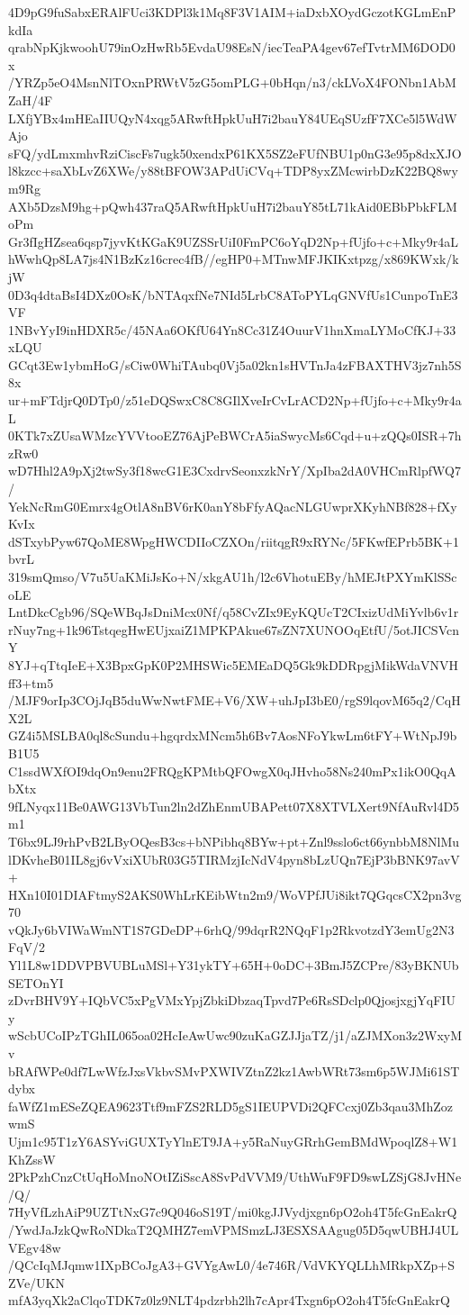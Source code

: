 4D9pG9fuSabxERAlFUci3KDPl3k1Mq8F3V1AIM+iaDxbXOydGczotKGLmEnPkdIa
qrabNpKjkwoohU79inOzHwRb5EvdaU98EsN/iecTeaPA4gev67efTvtrMM6DOD0x
/YRZp5eO4MsnNlTOxnPRWtV5zG5omPLG+0bHqn/n3/ckLVoX4FONbn1AbMZaH/4F
LXfjYBx4mHEaIIUQyN4xqg5ARwftHpkUuH7i2bauY84UEqSUzfF7XCe5l5WdWAjo
sFQ/ydLmxmhvRziCiscFs7ugk50xendxP61KX5SZ2eFUfNBU1p0nG3e95p8dxXJO
l8kzcc+saXbLvZ6XWe/y88tBFOW3APdUiCVq+TDP8yxZMcwirbDzK22BQ8wym9Rg
AXb5DzsM9hg+pQwh437raQ5ARwftHpkUuH7i2bauY85tL71kAid0EBbPbkFLMoPm
Gr3fIgHZsea6qsp7jyvKtKGaK9UZSSrUiI0FmPC6oYqD2Np+fUjfo+c+Mky9r4aL
hWwhQp8LA7js4N1BzKz16crec4fB//egHP0+MTnwMFJKIKxtpzg/x869KWxk/kjW
0D3q4dtaBsI4DXz0OsK/bNTAqxfNe7NId5LrbC8AToPYLqGNVfUs1CunpoTnE3VF
1NBvYyI9inHDXR5c/45NAa6OKfU64Yn8Cc31Z4OuurV1hnXmaLYMoCfKJ+33xLQU
GCqt3Ew1ybmHoG/sCiw0WhiTAubq0Vj5a02kn1sHVTnJa4zFBAXTHV3jz7nh5S8x
ur+mFTdjrQ0DTp0/z51eDQSwxC8C8GIlXveIrCvLrACD2Np+fUjfo+c+Mky9r4aL
0KTk7xZUsaWMzcYVVtooEZ76AjPeBWCrA5iaSwycMs6Cqd+u+zQQs0ISR+7hzRw0
wD7Hhl2A9pXj2twSy3f18wcG1E3CxdrvSeonxzkNrY/XpIba2dA0VHCmRlpfWQ7/
YekNcRmG0Emrx4gOtlA8nBV6rK0anY8bFfyAQacNLGUwprXKyhNBf828+fXyKvIx
dSTxybPyw67QoME8WpgHWCDIIoCZXOn/riitqgR9xRYNc/5FKwfEPrb5BK+1bvrL
319smQmso/V7u5UaKMiJsKo+N/xkgAU1h/l2c6VhotuEBy/hMEJtPXYmKlSScoLE
LntDkcCgb96/SQeWBqJsDniMcx0Nf/q58CvZIx9EyKQUcT2CIxizUdMiYvlb6v1r
rNuy7ng+1k96TstqegHwEUjxaiZ1MPKPAkue67sZN7XUNOOqEtfU/5otJICSVcnY
8YJ+qTtqIeE+X3BpxGpK0P2MHSWic5EMEaDQ5Gk9kDDRpgjMikWdaVNVHff3+tm5
/MJF9orIp3COjJqB5duWwNwtFME+V6/XW+uhJpI3bE0/rgS9lqovM65q2/CqHX2L
GZ4i5MSLBA0ql8cSundu+hgqrdxMNcm5h6Bv7AosNFoYkwLm6tFY+WtNpJ9bB1U5
C1ssdWXfOI9dqOn9enu2FRQgKPMtbQFOwgX0qJHvho58Ns240mPx1ikO0QqAbXtx
9fLNyqx11Be0AWG13VbTun2ln2dZhEnmUBAPett07X8XTVLXert9NfAuRvl4D5m1
T6bx9LJ9rhPvB2LByOQesB3cs+bNPibhq8BYw+pt+Znl9sslo6ct66ynbbM8NlMu
lDKvheB01IL8gj6vVxiXUbR03G5TIRMzjIcNdV4pyn8bLzUQn7EjP3bBNK97avV+
HXn10I01DIAFtmyS2AKS0WhLrKEibWtn2m9/WoVPfJUi8ikt7QGqcsCX2pn3vg70
vQkJy6bVIWaWmNT1S7GDeDP+6rhQ/99dqrR2NQqF1p2RkvotzdY3emUg2N3FqV/2
Yl1L8w1DDVPBVUBLuMSl+Y31ykTY+65H+0oDC+3BmJ5ZCPre/83yBKNUbSETOnYI
zDvrBHV9Y+IQbVC5xPgVMxYpjZbkiDbzaqTpvd7Pe6RsSDclp0QjosjxgjYqFIUy
wScbUCoIPzTGhIL065oa02HcIeAwUwc90zuKaGZJJjaTZ/j1/aZJMXon3z2WxyMv
bRAfWPe0df7LwWfzJxsVkbvSMvPXWIVZtnZ2kz1AwbWRt73sm6p5WJMi61STdybx
faWfZ1mESeZQEA9623Ttf9mFZS2RLD5gS1IEUPVDi2QFCcxj0Zb3qau3MhZozwmS
Ujm1c95T1zY6ASYviGUXTyYlnET9JA+y5RaNuyGRrhGemBMdWpoqlZ8+W1KhZssW
2PkPzhCnzCtUqHoMnoNOtIZiSscA8SvPdVVM9/UthWuF9FD9swLZSjG8JvHNe/Q/
7HyVfLzhAiP9UZTtNxG7c9Q046oS19T/mi0kgJJVydjxgn6pO2oh4T5fcGnEakrQ
/YwdJaJzkQwRoNDkaT2QMHZ7emVPMSmzLJ3ESXSAAgug05D5qwUBHJ4ULVEgv48w
/QCcIqMJqmw1IXpBCoJgA3+GVYgAwL0/4e746R/VdVKYQLLhMRkpXZp+SZVe/UKN
mfA3yqXk2aClqoTDK7z0lz9NLT4pdzrbh2lh7cApr4Txgn6pO2oh4T5fcGnEakrQ

